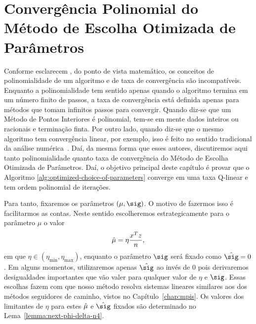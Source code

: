 




\chapter{Convergência  Polinomial do Método de Escolha Otimizada de Parâmetros}


\label{chap:convergence}


Conforme esclarecem \textcite{Zhang:1993gn}, do ponto de vista matemático, os conceitos de polinomialidade de um algoritmo e de taxa de convergência são incompatíveis. Enquanto a polinomialidade tem sentido apenas quando o algoritmo termina em um número finito de passos, a taxa de convergência  está definida apenas para métodos que tomam infinitos passos para convergir. Quando diz-se que um Método de Pontos Interiores é polinomial, tem-se em mente dados inteiros ou racionais e terminação finta. Por outro lado, quando diz-se que o mesmo algoritmo tem convergência linear, por exemplo, isso é feito  no sentido tradicional da análise numérica~\cite{Ortega:2000vd}.
Daí, da mesma forma que esses autores, discutiremos aqui tanto polinomialidade quanto taxa de convergência do Método de Escolha Otimizada de Parâmetros. Daí, o objetivo principal  deste capítulo é   provar  que o Algoritmo \ref{alg:optimized-choice-of-parameters} converge em uma taxa Q-linear e tem ordem polinomial de iterações.






 Para tanto,  fixaremos os parâmetros $(\mu,\sig)$. O motivo de fazermos isso é facilitarmos as contas. Neste sentido escolheremos estrategicamente  para o parâmetro  $\mu$ o valor \[\hat{\mu}=\eta\dfrac{x^Tz}{n},
\] 
em que $\eta\in (\eta_{\min},\eta_{\max} )$, enquanto o parâmetro $\sig$ será fixado como $\nextsig =0 $. Em alguns momentos, utilizaremos apenas $\nextsig$ ao invés de $0$ pois derivaremos desigualdades importantes que vão valer para qualquer valor de $\eta$ e $\sig$. Essas escolhas  fazem com que nosso método resolva  sistemas lineares similares aos dos métodos seguidores de caminho, vistos no Capítulo~\ref{chap:mpis}. Os valores dos limitantes de $\eta$ para  estes $\hat{\mu}$  e $\nextsig$ fixados são determinado no Lema~\ref{lemma:next-phi-delta-n4}.


